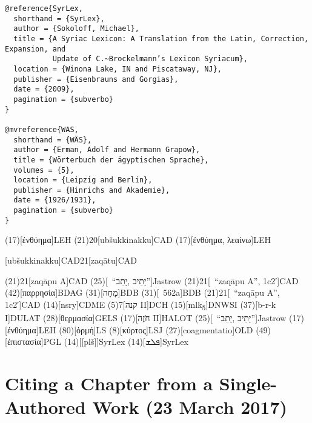 \documentclass[a4paper]{article}
\begin{document}
\begin{verbatim}
@reference{SyrLex,
  shorthand = {SyrLex},
  author = {Sokoloff, Michael},
  title = {A Syriac Lexicon: A Translation from the Latin, Correction, Expansion, and
           Update of C.~Brockelmann’s Lexicon Syriacum},
  location = {Winona Lake, IN and Piscataway, NJ},
  publisher = {Eisenbrauns and Gorgias},
  date = {2009},
  pagination = {subverbo}
}

@mvreference{WAS,
  shorthand = {WÄS},
  author = {Erman, Adolf and Hermann Grapow},
  title = {Wörterbuch der ägyptischen Sprache},
  volumes = {5},
  location = {Leipzig and Berlin},
  publisher = {Hinrichs and Akademie},
  date = {1926/1931},
  pagination = {subverbo}
}
\end{verbatim}


\examplecite(17)[ἐνθύημα]{LEH}
\examplevolcite(21){20}[ubšukkinakku]{CAD}
\examplecite(17)[ἐνθύημα, λεαίνω]{LEH}
\begin{fverbcite}{21}
  [ubšukkinakku]{CAD}{21}[zaqātu]{CAD}
\end{fverbcite}
\examplevolcite(21){21}[zaqāpu A]{CAD}
\examplecite(25)[\sv~\mkbibquote{יָתֵיב ,יָתֵב}]{Jastrow}
\examplevolcite(21){21}[\sv~\mkbibquote{zaqāpu A}, 1c2′]{CAD}
\examplecite(42)[παρρησία]{BDAG}
\examplecite(31)[מָחָה]{BDB}
\examplecite(31)[\nopp 562a]{BDB}
\examplevolcite(21){21}[\sv~\mkbibquote{zaqāpu A}, 1c2′]{CAD}
\examplecite(14)[nsry]{CDME}
\examplevolcite(5){7}[קנה II]{DCH}
\examplecite(15)[mlk\textsubscript{5}]{DNWSI}
\examplecite(37)[b-r-k I]{DULAT}
\examplecite(28)[θερμασία]{GELS}
\examplecite(17)[חֹזֶה II]{HALOT}
\examplecite(25)[\sv~\mkbibquote{יָתֵיב ,יָתֵב}]{Jastrow}
\examplecite(17)[ἐνθύημα]{LEH}
\examplecite(80)[ὁρμή]{LS}
\examplecite(8)[κύρτος]{LSJ}
\examplecite(27)[coagmentatio]{OLD}
\examplecite(49)[ἐπιστασία]{PGL}
\examplecite(14)[\mkbibbrackets{plš}]{SyrLex}
\examplecite(14)[ܦܠܫ]{SyrLex}
\begin{verbcite}
  \nocite{BAG, BAGD, CHD, HAL, HED, KBL, Lane, LexSyr, WAS}
\end{verbcite}
\exampleabbreviations
{}

\section{Citing a Chapter from a Single-Authored Work (23 March 2017)}
\end{document}
